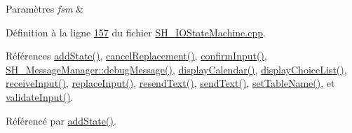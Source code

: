 \begin{DoxyParams}{Paramètres}
{\em fsm} & \\
\hline
\end{DoxyParams}


Définition à la ligne \hyperlink{SH__IOStateMachine_8cpp_source_l00157}{157} du fichier \hyperlink{SH__IOStateMachine_8cpp_source}{S\-H\-\_\-\-I\-O\-State\-Machine.\-cpp}.



Références \hyperlink{classSH__InOutStateMachine_a3de9dedcdfd6efab868484c047638f71}{add\-State()}, \hyperlink{classSH__InOutStateMachine_a035d37535533d4805fe2606f38c19380}{cancel\-Replacement()}, \hyperlink{classSH__InOutStateMachine_a7f7d9c9300c1d05bce2c26029f28cc31}{confirm\-Input()}, \hyperlink{classSH__MessageManager_a379f2aa0a590a5add34dbe91f98b2ff7}{S\-H\-\_\-\-Message\-Manager\-::debug\-Message()}, \hyperlink{classSH__InOutStateMachine_ab3a12d1f9b658d8ffdc17669a6c065f2}{display\-Calendar()}, \hyperlink{classSH__InOutStateMachine_ab74b981b0aab09067d7479f2b7e79b0b}{display\-Choice\-List()}, \hyperlink{classSH__InOutStateMachine_a037ed5e13ecfae2123a8d4940292e410}{receive\-Input()}, \hyperlink{classSH__InOutStateMachine_a9fa5db44086de2576c812f631aa4f60a}{replace\-Input()}, \hyperlink{classSH__InOutStateMachine_a526822c66b46aa0cd81ba4473fa5573f}{resend\-Text()}, \hyperlink{classSH__InOutStateMachine_a5e7f5958bae31696b6a8deab94ad2b4f}{send\-Text()}, \hyperlink{classSH__InOutStateMachine_a95db31a7e7f31f36a8737adc739ab08c}{set\-Table\-Name()}, et \hyperlink{classSH__InOutStateMachine_aec1b3fef3c1f82499aa1f73beaecd08a}{validate\-Input()}.



Référencé par \hyperlink{classSH__InOutStateMachine_adcd6eb72b60b2c24aa6701977b5c7c1e}{add\-State()}.


